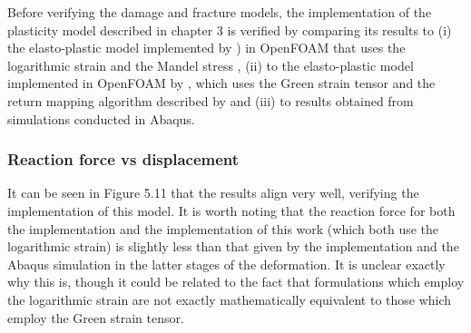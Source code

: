 \documentclass[sn-mathphys,Numbered,draft]{sn-jnl}%
\begin{document}

Before verifying the damage and fracture models, the implementation of the plasticity model described in chapter 3 is verified by comparing its results to (i) the elasto-plastic model implemented by  \citet{clancy_improving_2019}) in OpenFOAM that uses the logarithmic strain and the Mandel stress \cite{caminero_modeling_2011}, (ii) to the elasto-plastic model implemented in OpenFOAM by \citet{cardiff_lagrangian_2017}, which uses the Green strain tensor and the return mapping algorithm described by \citet{simo_computational_1998} and (iii) to results obtained from simulations conducted in Abaqus.



%

\subsubsection{Reaction force vs displacement}

It can be seen in Figure 5.11 that the results align very well, verifying the implementation of this model. It is worth noting that the reaction force for both the \citet{clancy_improving_2019} implementation and the implementation of this work (which both use the logarithmic strain) is slightly less than that given by the \citet{cardiff_lagrangian_2017} implementation and the Abaqus simulation in the latter stages of the deformation. It is unclear exactly why this is, though it could be related to the fact that formulations which employ the logarithmic strain are not exactly mathematically equivalent to those which employ the Green strain tensor.
\end{document}
